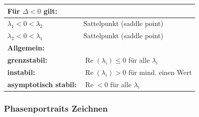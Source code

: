 \begin{longtable}{|p{}|p{}|}
	\multicolumn{2}{l}{Für $\Delta < 0$ gilt:} \\
	
	\hline $\lambda_1 < 0 < \lambda_2$ & Sattelpunkt (saddle point) \\
	\hline $\lambda_2 < 0 < \lambda_1$ & Sattelpunkt (saddle point) \\
	\hline
	
	\multicolumn{2}{l}{\textbf{Allgemein:}}\\
	
	\hline
	\textbf{grenzstabil:} & $\operatorname{Re}(\lambda_i) \leq 0$ für alle $\lambda_i$ \\
	\textbf{instabil:} & $\operatorname{Re}(\lambda_i) > 0$ für mind. einen Wert \\
	\textbf{asymptotisch stabil:} &$\operatorname{Re} < 0$ für alle $\lambda_i$ \\
	\hline
\end{longtable}

\subsubsection{Phasenportraits Zeichnen}

